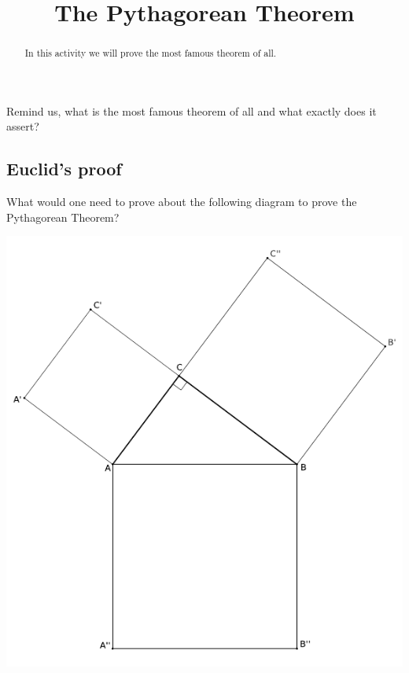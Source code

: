 \documentclass{ximera}
\title{The Pythagorean Theorem}
\begin{document}
\begin{abstract}
In this activity we will prove the most famous theorem of
  all.
\end{abstract}
\maketitle



\begin{question}
Remind us, what is the most famous theorem of all and what exactly
does it assert?
\end{question}


\subsection*{Euclid's proof}


\begin{question} 
What would one need to prove about the following diagram to prove the
Pythagorean Theorem?
\begin{image}
\includegraphics{EuclidAndGeometry/PythEuclid.pdf}
\end{image}
\end{question}
\end{document}
